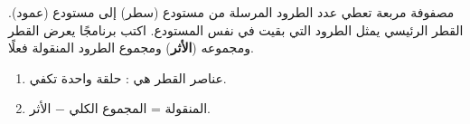 \begin{statement}
مصفوفة مربعة  تعطي عدد الطرود المرسلة من مستودع (سطر) إلى مستودع (عمود). القطر الرئيسي يمثل الطرود التي بقيت في نفس المستودع. اكتب برنامجًا يعرض القطر ومجموعه (\textbf{الأثر}) ومجموع الطرود المنقولة فعلًا.
\end{statement}
\begin{stepsbox}\begin{enumerate}
\item عناصر القطر هي : حلقة واحدة تكفي.
\item المنقولة = المجموع الكلي − الأثر.
\end{enumerate}\end{stepsbox}
